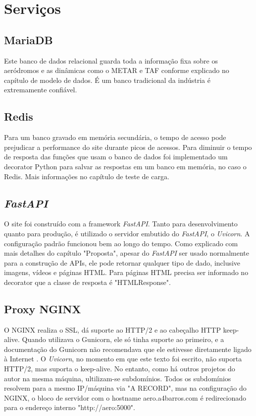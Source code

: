 \section{Serviços}

\subsection{MariaDB}
Este banco de dados relacional guarda toda a informação fixa sobre os aeródromos e as dinâmicas
como o METAR e TAF conforme explicado no capítulo de modelo de dados. É um banco tradicional
da indústria é extremamente confiável.

\subsection{Redis}
Para um banco gravado em memória secundária, o tempo de acesso pode prejudicar a 
performance do site durante picos de acessos. Para diminuir o tempo de resposta das
funções que usam o banco
de dados foi implementado um decorator Python para salvar as respostas em um banco
em memória, no caso o Redis. Mais informações no capítulo de teste de carga.

\subsection{\textit{FastAPI}}

O site foi construído com a framework \textit{FastAPI}. Tanto para desenvolvimento quanto para produção, 
é utilizado o servidor embutido do \textit{FastAPI}, o \textit{Uvicorn}. A configuração padrão funcionou bem ao
longo do tempo. Como explicado com mais detalhes do capítulo "Proposta", apesar do \textit{FastAPI} ser
usado normalmente para a construção de APIs, ele pode retornar qualquer tipo de dado, inclusive
imagens, vídeos e páginas HTML. Para páginas HTML precisa ser informado no decorator que a
classe de resposta é "HTMLResponse".



\subsection{Proxy NGINX}
O NGINX realiza o SSL, dá suporte ao HTTP/2 e ao cabeçalho HTTP keep-alive. Quando
utilizava o Gunicorn, ele só tinha suporte ao primeiro, e a documentação do Gunicorn não
recomendava que ele estivesse diretamente ligado à Internet \cite{nginx-gunicorn}. O \textit{Uvicorn},
no momento em que este texto foi escrito, não suporta HTTP/2, mas suporta o keep-alive. No
entanto, como há outros projetos do autor na mesma máquina, ultilizam-se subdomínios. Todos os subdomínios
resolvem para a mesmo IP/máquina via "A RECORD", mas na configuração
do NGINX, o bloco de servidor com o hostname aero.a4barros.com é redirecionado para o
endereço interno "http://aero:5000".



